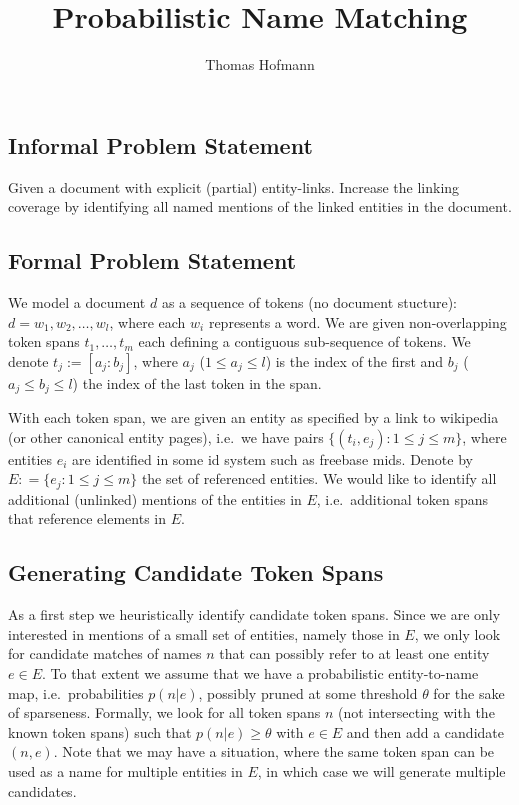 \documentclass{article}
\title{Probabilistic Name Matching}
\author{Thomas Hofmann}
\begin{document}
\maketitle

\subsection*{Informal Problem Statement}
Given a document with explicit (partial) entity-links. Increase the linking coverage by identifying all named mentions of the linked entities in the document. 

\subsection*{Formal Problem Statement}

We model a document $d$ as a sequence of tokens (no document stucture): $d = w_1,w_2,\dots,w_l$, where each $w_i$ represents a word. We are given non-overlapping token spans $t_1,\dots,t_m$ each defining a contiguous sub-sequence  of tokens.  We denote $t_j := [a_j:b_j]$, where $a_j$ ($1 \leq a_j \leq l$) is the index of the first and $b_j$ ($a_j \leq b_j \leq l$) the index of the last token in the span. 

With each token span, we are given an entity as specified by a link to wikipedia (or other canonical entity pages), i.e.~we have pairs $\{(t_i,e_j): 1 \leq j \leq m \}$, where entities $e_i$ are identified in some id system such as freebase mids. Denote by $E: = \{ e_j: 1 \leq j \leq m\}$ the set of referenced entities. We would like to identify all additional (unlinked) mentions of the entities in $E$, i.e.~additional token spans that reference elements in $E$. 

\subsection*{Generating Candidate Token Spans} 

As a first step we heuristically identify candidate token spans. Since we are only interested in mentions of a small set of entities, namely those in $E$, we only look for candidate matches of names $n$ that can possibly refer to at least one entity $e \in E$. To that extent we assume that we have a  probabilistic entity-to-name map, i.e.~probabilities $p(n|e)$, possibly pruned at some threshold $\theta$ for the sake of sparseness. Formally, we look for all token spans $n$ (not intersecting with the known token spans) such that $p(n|e) \geq \theta$  with $e \in E$ and then add a candidate $(n,e)$. Note that we may have a situation, where the same token span can be used as a name for multiple entities in $E$, in which case we will generate multiple candidates. 
\end{document}
